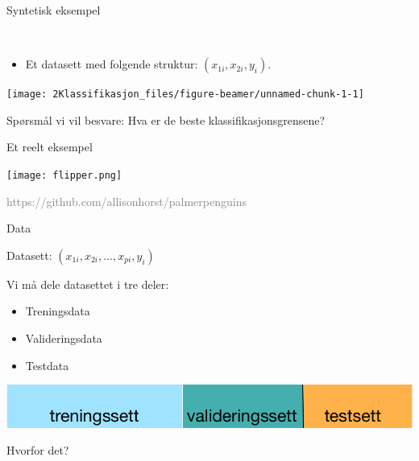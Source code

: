 \documentclass[10pt,ignorenonframetext,]{beamer}
\providecommand{\tightlist}{%
  \setlength{\itemsep}{0pt}\setlength{\parskip}{0pt}}
\begin{document}
\begin{frame}

\begin{block}{Syntetisk eksempel}

\(~\)

\begin{itemize}
\tightlist
\item
  Et datasett med folgende struktur: \((x_{1i},x_{2i},y_i)\).
  \vspace{2mm}
\end{itemize}

\begin{center}\texttt{[image: 2Klassifikasjon\_files/figure-beamer/unnamed-chunk-1-1]} \end{center}

Spørsmål vi vil besvare: Hva er de beste klassifikasjonsgrensene?

\end{block}

\end{frame}

\begin{frame}

\begin{block}{Et reelt eksempel}

\vspace{2mm}

\texttt{[image: flipper.png]}

\tiny

\textcolor{gray}{https://github.com/allisonhorst/palmerpenguins}

\end{block}

\end{frame}

\begin{frame}{Data}
\protect\hypertarget{data}{}

\vspace{2mm}

Datasett: \((x_{1i},x_{2i},\ldots, x_{pi},y_i)\)

\vspace{2mm}

Vi må dele datasettet i tre deler:

\vspace{2mm}

\begin{itemize}
\tightlist
\item
  Treningsdata
\item
  Valideringsdata
\item
  Testdata
\end{itemize}

\vspace{5mm}

\includegraphics{datasett.png}

\vspace{2mm}

Hvorfor det?

\end{frame}
\end{document}
